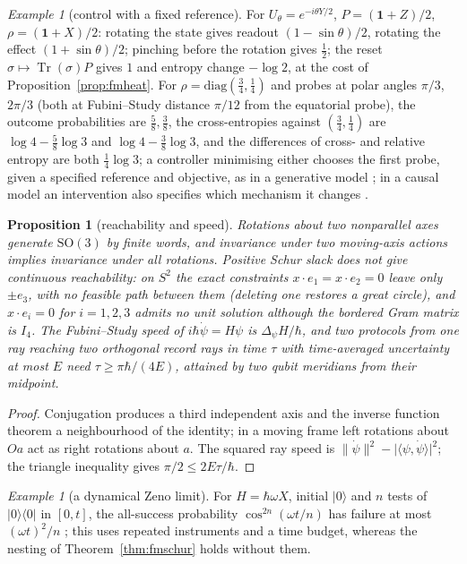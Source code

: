 \documentclass[aps,pra,onecolumn,superscriptaddress,nofootinbib,10pt]{revtex4-2}
\newtheorem{proposition}[theorem]{Proposition}
\theoremstyle{definition}
\theoremstyle{remark}
\newtheorem{example}[theorem]{Example}
\newcommand{\tr}{\operatorname{Tr}}
\newcommand{\ip}[2]{\langle #1,#2\rangle}
\newcommand{\SO}{\mathrm{SO}}
\begin{document}
\begin{example}[control with a fixed reference]\label{ex:fmaction}
For $U_\theta=e^{-i\theta Y/2}$, $P=(\mathbf1+Z)/2$, $\rho=(\mathbf1+X)/2$: rotating the state gives readout $(1-\sin\theta)/2$, rotating the effect $(1+\sin\theta)/2$;
pinching before the rotation gives $\tfrac12$; the reset $\sigma\mapsto\tr(\sigma)P$ gives $1$ and entropy change $-\log2$, at the cost of
Proposition~\ref{prop:fmheat}.  For $\rho=\mathrm{diag}(\tfrac34,\tfrac14)$ and probes at polar angles $\pi/3$, $2\pi/3$ (both at Fubini--Study distance
$\pi/12$ from the equatorial probe), the outcome probabilities are $\tfrac58,\tfrac38$, the cross-entropies against $(\tfrac34,\tfrac14)$ are
$\log4-\tfrac58\log3$ and $\log4-\tfrac38\log3$, and the differences of cross- and relative entropy are both $\tfrac14\log3$; a controller
minimising either chooses the first probe, given a specified reference and objective, as in a
generative model \cite{n2-friston}; in a causal model an intervention also specifies which mechanism it
changes \cite{n2-pearl}.
\end{example}

\begin{proposition}[reachability and speed]\label{prop:fmspeed}
Rotations about two nonparallel axes generate $\SO(3)$ by finite words, and invariance under two moving-axis
actions implies invariance under all rotations.  \emph{Positive Schur slack does not give continuous
reachability}: on $S^2$ the exact constraints $x\cdot e_1=x\cdot e_2=0$ leave only $\pm e_3$, with no feasible path between them
(deleting one restores a great circle), and $x\cdot e_i=0$ for $i=1,2,3$ admits no unit solution although the bordered
Gram matrix is $I_4$.  The Fubini--Study speed of $i\hbar\dot\psi=H\psi$ is $\Delta_\psi H/\hbar$, and two protocols from one ray reaching
two orthogonal record rays in time $\tau$ with time-averaged uncertainty at most $E$ need $\tau\ge\pi\hbar/(4E)$, attained by two qubit
meridians from their midpoint.
\end{proposition}
\begin{proof}
Conjugation produces a third independent axis and the inverse function theorem a neighbourhood of
the identity; in a moving frame left rotations about $Oa$ act as right rotations about $a$.  The squared ray speed is
$\lVert\dot\psi\rVert^2-\lvert\ip\psi{\dot\psi}\rvert^2$; the triangle inequality gives $\pi/2\le2E\tau/\hbar$.
\end{proof}

\begin{example}[a dynamical Zeno limit]\label{ex:fmzeno}
For $H=\hbar\omega X$, initial $\lvert0\rangle$ and $n$ tests of $\lvert0\rangle\langle0\rvert$ in $[0,t]$, the all-success probability $\cos^{2n}(\omega t/n)$ has failure at most
$(\omega t)^2/n$ \cite{n3:Zeno}; this uses repeated instruments and a time budget, whereas the nesting of
Theorem~\ref{thm:fmschur} holds without them.
\end{example}
\end{document}
